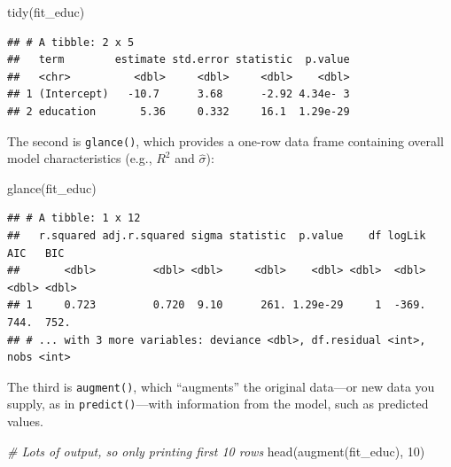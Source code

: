 \documentclass[
  12pt,
  oneside,openany]{book}
\newenvironment{Shaded}{\begin{snugshade}}{\end{snugshade}}
\newcommand{\CommentTok}[1]{\textcolor[rgb]{0.56,0.35,0.01}{\textit{#1}}}
\newcommand{\DecValTok}[1]{\textcolor[rgb]{0.00,0.00,0.81}{#1}}
\newcommand{\FunctionTok}[1]{\textcolor[rgb]{0.00,0.00,0.00}{#1}}
\newcommand{\NormalTok}[1]{#1}
\begin{document}
\begin{Shaded}
\begin{Highlighting}[]
\FunctionTok{tidy}\NormalTok{(fit\_educ)}
\end{Highlighting}
\end{Shaded}

\begin{verbatim}
## # A tibble: 2 x 5
##   term        estimate std.error statistic  p.value
##   <chr>          <dbl>     <dbl>     <dbl>    <dbl>
## 1 (Intercept)   -10.7      3.68      -2.92 4.34e- 3
## 2 education       5.36     0.332     16.1  1.29e-29
\end{verbatim}

The second is \texttt{glance()}, which provides a one-row data frame containing overall model characteristics (e.g., \(R^2\) and \(\hat{\sigma}\)):

\begin{Shaded}
\begin{Highlighting}[]
\FunctionTok{glance}\NormalTok{(fit\_educ)}
\end{Highlighting}
\end{Shaded}

\begin{verbatim}
## # A tibble: 1 x 12
##   r.squared adj.r.squared sigma statistic  p.value    df logLik   AIC   BIC
##       <dbl>         <dbl> <dbl>     <dbl>    <dbl> <dbl>  <dbl> <dbl> <dbl>
## 1     0.723         0.720  9.10      261. 1.29e-29     1  -369.  744.  752.
## # ... with 3 more variables: deviance <dbl>, df.residual <int>, nobs <int>
\end{verbatim}

The third is \texttt{augment()}, which ``augments'' the original data---or new data you supply, as in \texttt{predict()}---with information from the model, such as predicted values.

\begin{Shaded}
\begin{Highlighting}[]
\CommentTok{\# Lots of output, so only printing first 10 rows}
\FunctionTok{head}\NormalTok{(}\FunctionTok{augment}\NormalTok{(fit\_educ), }\DecValTok{10}\NormalTok{)}
\end{Highlighting}
\end{Shaded}
\end{document}
